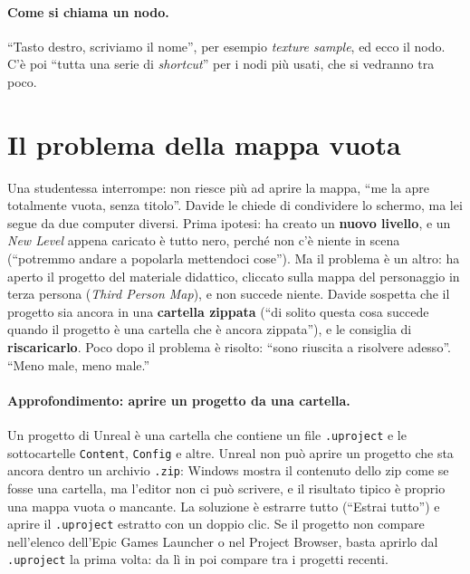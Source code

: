 \paragraph{Come si chiama un nodo.} ``Tasto destro, scriviamo il nome'', per esempio
\emph{texture sample}, ed ecco il nodo. C'è poi ``tutta una serie di \emph{shortcut}''
per i nodi più usati, che si vedranno tra poco.

\section{Il problema della mappa vuota}
\label{ue3:sec:mappavuota}

Una studentessa interrompe: non riesce più ad aprire la mappa, ``me la apre totalmente
vuota, senza titolo''. Davide le chiede di condividere lo schermo, ma lei segue da due
computer diversi. Prima ipotesi: ha creato un \textbf{nuovo livello}, e un \emph{New
Level} appena caricato è tutto nero, perché non c'è niente in scena (``potremmo andare
a popolarla mettendoci cose''). Ma il problema è un altro: ha aperto il progetto del
materiale didattico, cliccato sulla mappa del personaggio in terza persona
(\emph{Third Person Map}), e non succede niente. Davide sospetta che il progetto sia
ancora in una \textbf{cartella zippata} (``di solito questa cosa succede quando il
progetto è una cartella che è ancora zippata''), e le consiglia di
\textbf{riscaricarlo}. Poco dopo il problema è risolto: ``sono riuscita a risolvere
adesso''. ``Meno male, meno male.''

\paragraph{Approfondimento: aprire un progetto da una cartella.} Un progetto di Unreal
è una cartella che contiene un file \texttt{.uproject} e le sottocartelle
\texttt{Content}, \texttt{Config} e altre. Unreal non può aprire un progetto che sta
ancora dentro un archivio \texttt{.zip}: Windows mostra il contenuto dello zip come se
fosse una cartella, ma l'editor non ci può scrivere, e il risultato tipico è proprio
una mappa vuota o mancante. La soluzione è estrarre tutto (``Estrai tutto'') e aprire il
\texttt{.uproject} estratto con un doppio clic. Se il progetto non compare nell'elenco
dell'Epic Games Launcher o nel Project Browser, basta aprirlo dal \texttt{.uproject}
la prima volta: da lì in poi compare tra i progetti recenti.

